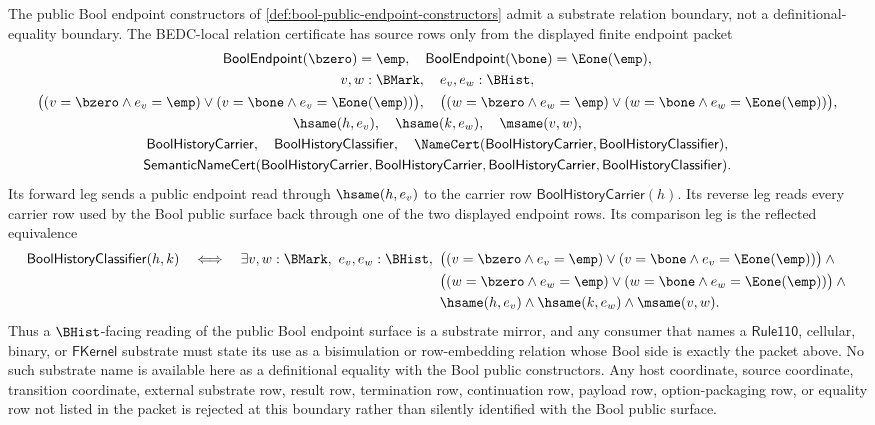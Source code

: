 \begin{lemma}
\label{lem:bool-public-endpoint-substrate-bisimulation-boundary}
The public Bool endpoint constructors of \autoref{def:bool-public-endpoint-constructors} admit a substrate relation boundary, not a definitional-equality boundary. The BEDC-local relation certificate has source rows only from the displayed finite endpoint packet
$$
\begin{gathered}
\mathsf{BoolEndpoint}(\bzero)=\emp,\quad
\mathsf{BoolEndpoint}(\bone)=\Eone(\emp),\\
v,w:\BMark,\quad e_v,e_w:\BHist,\\
\bigl((v=\bzero \land e_v=\emp) \lor (v=\bone \land e_v=\Eone(\emp))\bigr),\quad
\bigl((w=\bzero \land e_w=\emp) \lor (w=\bone \land e_w=\Eone(\emp))\bigr),\\
\hsame(h,e_v),\quad \hsame(k,e_w),\quad \msame(v,w),\\
\mathsf{BoolHistoryCarrier},\quad
\mathsf{BoolHistoryClassifier},\quad
\NameCert(\mathsf{BoolHistoryCarrier},\mathsf{BoolHistoryClassifier}),\\
\mathsf{SemanticNameCert}(\mathsf{BoolHistoryCarrier},\mathsf{BoolHistoryCarrier},
\mathsf{BoolHistoryCarrier},\mathsf{BoolHistoryClassifier}).
\end{gathered}
$$
Its forward leg sends a public endpoint read through $\hsame(h,e_v)$ to the carrier row $\mathsf{BoolHistoryCarrier}(h)$. Its reverse leg reads every carrier row used by the Bool public surface back through one of the two displayed endpoint rows. Its comparison leg is the reflected equivalence
$$
\mathsf{BoolHistoryClassifier}(h,k)
\quad\Longleftrightarrow\quad
\exists v,w:\BMark,\ e_v,e_w:\BHist,\
\begin{aligned}[t]
&\bigl((v=\bzero \land e_v=\emp) \lor (v=\bone \land e_v=\Eone(\emp))\bigr)\land{}\\
&\bigl((w=\bzero \land e_w=\emp) \lor (w=\bone \land e_w=\Eone(\emp))\bigr)\land{}\\
&\hsame(h,e_v)\land \hsame(k,e_w)\land \msame(v,w).
\end{aligned}
$$
Thus a $\BHist$-facing reading of the public Bool endpoint surface is a substrate mirror, and any consumer that names a $\mathsf{Rule110}$, cellular, binary, or $\mathsf{FKernel}$ substrate must state its use as a bisimulation or row-embedding relation whose Bool side is exactly the packet above. No such substrate name is available here as a definitional equality with the Bool public constructors. Any host coordinate, source coordinate, transition coordinate, external substrate row, result row, termination row, continuation row, payload row, option-packaging row, or equality row not listed in the packet is rejected at this boundary rather than silently identified with the Bool public surface.
\end{lemma}
